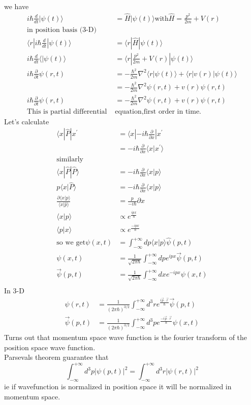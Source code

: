 we have \\
$$
\begin{aligned}
i\hbar \frac{d}{dt}|\psi(t)\rangle &=\hat{H}|\psi(t)\rangle 
\text{with} \hat{H}=\frac{p^2}{2m}+V(r)\\
\text{in position basis (3-D)}\\
\langle r|i\hbar \frac{d}{dt}|\psi(t)\rangle&=\langle r|\hat{H}|\psi(t)\rangle\\
i\hbar \frac{d}{dt}\langle |\psi(t)\rangle&=\langle r|\frac{p^2}{2m}+V(r)|\psi(t)\rangle\\
i\hbar\frac{\partial}{\partial t}\psi(r,t)&=-\frac{\hbar^2}{2m} \nabla^2\langle r|\psi(t)\rangle+\langle r|v(r)|\psi(t)\rangle\\
&=-\frac{\hbar^2}{2m}\nabla^2\psi(r,t)+v(r)\psi(r,t)\\
i\hbar \frac{\partial}{\partial t}\psi(r,t)&=-\frac{\hbar^2}{2m} \nabla^2 \psi(r,t)+v(r)\psi(r,t)\\
\text{This is partial differential }&\text{equation,first order in time.}
\end{aligned}
$$
Let's calculate
$$
\begin{aligned}
\langle x|\hat{P}|x^{\prime}&=\langle x|-i\hbar \frac{\partial}{\partial x}|x^{\prime}\\
&=-i\hbar \frac{\partial}{\partial x} \langle x|x^{\prime} \rangle\\
\text{similarly}\\
\langle x|\hat{P}|\hat{P}\rangle&=-i\hbar \frac{\partial}{\partial x}\langle x|p\rangle\\
p\langle x|\hat{P}\rangle&=-i\hbar\frac{\partial}{\partial x} \langle x|p\rangle\\
\frac{\partial \langle x|p\rangle}{\langle x|\hat{p}\rangle}&=\frac{p}{-i\hbar}\partial x\\
\langle x|p\rangle &\propto e^{\frac{ipx}{\hbar}}\\
\langle p|x\rangle &\propto e^{\frac{-ipx}{\hbar}}\\
\text{so we get}
\psi(x,t)&=\int_{-\infty}^{+\infty} dp\langle x|p\rangle \hat{\psi}(p,t)\\
\psi(x,t)&=\frac{1}{\sqrt{2\pi \hbar}}\int_{-\infty}^{+\infty} dp e^{ipx} \vec{\psi}(p,t)\\
\vec{\psi}(p,t)&=\frac{1}{\sqrt{2\pi \hbar}} \int_{-\infty}^{+\infty}dxe^{-ipx} \psi(x,t)\\
\end{aligned}
$$
In 3-D
$$
\begin{aligned}
\psi(r,t)&=\frac{1}{(2\pi \hbar)^{3/2}}\int_{-\infty}^{+\infty}d^3r e^{\frac{i\vec{p}\cdot \vec{r}}{\hbar}} \vec{\psi}(p,t)\\
\vec{\psi}(p,t)&=\frac{1}{(2\pi \hbar)^{3/2}}\int_{-\infty}^{+\infty}d^3p e^{\frac{-i\vec{p}\cdot \vec{r}}{\hbar}} \psi(x,t)
\end{aligned}
$$
Turns out that momentum space wave function is the fourier transform of the position space wave function.\\
Parsevals theorem guarantee that\\
$$\int_{-\infty}^{+\infty} d^3p |\psi(p,t)|^2=\int_{-\infty}^{+\infty} d^3r |\psi(r,t)|^2$$
ie if wavefunction is normalized in position space it will be normalized in momentum space.
